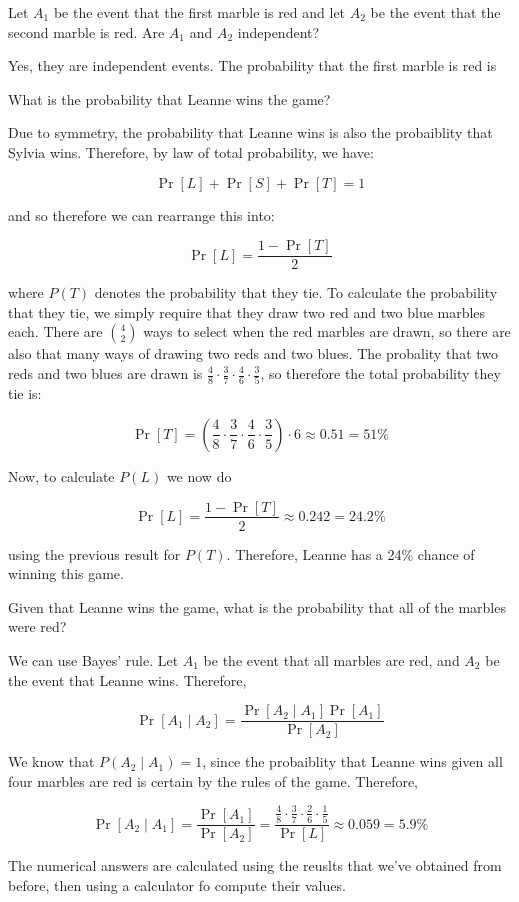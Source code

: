 \documentclass[11pt]{article}
\begin{document}
\begin{Parts}
    \Part Let $A_1$ be the event that the first marble is red and let $A_2$ be the event that the second marble is red. Are $A_1$ and $A_2$ independent?
    
    \begin{solution}
        Yes, they are independent events. The probability that the first marble is red is 
    \end{solution}
    \Part What is the probability that Leanne wins the game?

    \begin{solution}
        Due to symmetry, the probability that Leanne wins is also the probaiblity that Sylvia wins. Therefore, by law of total probability, we have:

        \[ \Pr[L] + \Pr[S] + \Pr[T] = 1 \] 

        and so therefore we can rearrange this into: 

        \[ \Pr[L] = \frac{1 - \Pr[T]}{2}\]

        where $P(T)$ denotes the probability that they tie. To calculate the probability that they tie, we simply require that they draw two red and two blue marbles each. There are $4 \choose 2$ ways to select when the red marbles are drawn, so there are also that many ways of drawing two reds and two blues. The probality that two reds and two blues are drawn is $\frac 48 \cdot \frac 37 \cdot \frac 46 \cdot \frac 35$, so therefore the total probability they tie is: 

        \[ \Pr[T] = \left(\frac 48 \cdot \frac 37 \cdot \frac 46 \cdot \frac 35\right)\cdot 6 \approx 0.51 = 51\%\]

        Now, to calculate $P(L)$ we now do 

        \[ \Pr[L] = \frac{1 - \Pr[T]}{2} \approx 0.242 = 24.2\%\] 

        using the previous result for $P(T)$. Therefore, Leanne has a 24\% chance of winning this game.
    \end{solution}
    
    \Part Given that Leanne wins the game, what is the probability that all of the marbles were red?

    \begin{solution}
        We can use Bayes' rule. Let $A_1$ be the event that all marbles are red, and $A_2$ be the event that Leanne wins. Therefore, 

        \[ \Pr[A_1 \mid A_2] = \frac{\Pr[A_2 \mid A_1]\Pr[A_1]}{\Pr[A_2]}\]

        We know that $P(A_2 \mid A_1) = 1$, since the probaiblity that Leanne wins given all four marbles are red is certain by the rules of the game. Therefore, 

        \[ \Pr[A_2 \mid A_1] = \frac{\Pr[A_1]}{\Pr[A_2]} = \frac{\frac 48 \cdot \frac 37 \cdot \frac 26 \cdot \frac 15}{\Pr[L]} \approx 0.059 = 5.9\%\] 

        The numerical answers are calculated using the reuslts that we've obtained from before, then using a calculator fo compute their values.
    \end{solution}
\end{Parts}
\end{document}

